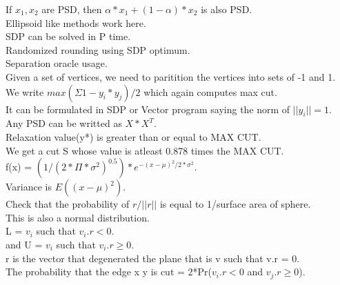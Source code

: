 \documentclass[solution,addpoints,12pt]{exam}
\begin{document}
If $x_1, x_2$ are PSD, then $\alpha*x_1 + (1 - \alpha)*x_2$ is also PSD.\\
Ellipsoid like methods work here.\\

SDP can be solved in P time.\\
Randomized rounding using SDP optimum.\\
Separation oracle usage.\\

Given a set of vertices, we need to paritition the vertices
into sets of -1 and 1.\\
We write $max(\Sigma 1 - y_i*y_j)/2$ which again computes max cut.\\

It can be formulated in SDP or Vector program saying the norm of $||y_i|| = 1$.\\
Any PSD can be writted as $X*X^T$.\\

Relaxation value(y*) is greater than or equal to MAX CUT.\\
We get a cut S whose value is atleast 0.878 times the MAX CUT.\\

f(x) = $(1/{(2*\Pi*\sigma^2)}^0.5)*e^{-{(x-\mu)}^2/2*\sigma^2}$.\\
Variance is $E({(x - \mu)}^2)$.\\

Check that the probability of $r/||r||$ is equal to 1/surface area of sphere.\\
This is also a normal distribution.\\
L = $v_i$ such that $v_i.r < 0$.\\
and U = $v_i$ such that $v_i.r \ge 0$.\\
r is the vector that degenerated the plane that is v such that v.r = 0.\\
The probability that the edge x y is cut = 2*Pr($v_i.r < 0$ and $v_j.r \ge 0$).\\
\end{document}
